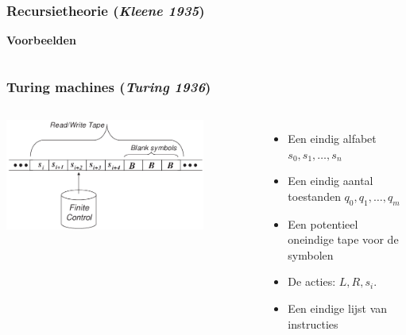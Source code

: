 \documentclass{beamer}
\begin{document}
\begin{frame}
    \frametitle{Recursietheorie (\emph{Kleene 1935})}
    \textbf{Voorbeelden}
    \begin{columns}
        \end{columns}
        \vspace{1cm}
\end{frame}

\begin{frame}
    \frametitle{Turing machines (\emph{Turing 1936})}
    \begin{columns}
            \includegraphics[width=0.8\textwidth]{tm.png}
            \begin{itemize}
                \item<2-> Een eindig alfabet $s_0, s_1, \ldots, s_n$
                \item<3-> Een eindig aantal toestanden $q_0, q_1, \ldots, q_m$
                \item<4-> Een potentieel oneindige tape voor de symbolen
                \item<5-> De acties: $L, R, s_i$.
                \item<6-> Een eindige lijst van instructies
            \end{itemize}
    \end{columns}
\end{frame}
\end{document}
